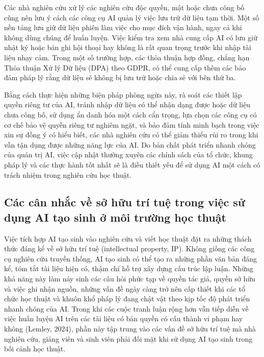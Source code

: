 Các nhà nghiên cứu xử lý các nghiên cứu độc quyền, mật hoặc chưa công bố cũng nên lưu ý cách các công cụ AI quản lý việc lưu trữ dữ liệu tạm thời. Một số nền tảng lưu giữ dữ liệu phiên làm việc cho mục đích vận hành, ngay cả khi không dùng chúng để huấn luyện. Việc kiểm tra xem nhà cung cấp AI có lưu giữ nhật ký hoặc bản ghi hội thoại hay không là rất quan trọng trước khi nhập tài liệu nhạy cảm. Trong một số trường hợp, các thỏa thuận hợp đồng, chẳng hạn Thỏa thuận Xử lý Dữ liệu (DPA) theo GDPR, có thể cung cấp thêm các bảo đảm pháp lý rằng dữ liệu sẽ không bị lưu trữ hoặc chia sẻ với bên thứ ba.

Bằng cách thực hiện những biện pháp phòng ngừa này, rà soát các thiết lập quyền riêng tư của AI, tránh nhập dữ liệu có thể nhận dạng được hoặc dữ liệu chưa công bố, sử dụng ẩn danh hóa một cách cẩn trọng, lựa chọn các công cụ có cơ chế bảo vệ quyền riêng tư nghiêm ngặt, và bảo đảm tính minh bạch trong việc xin sự đồng ý có hiểu biết, các nhà nghiên cứu có thể giảm thiểu rủi ro trong khi vẫn tận dụng được những năng lực của AI. Do bản chất phát triển nhanh chóng của quản trị AI, việc cập nhật thường xuyên các chính sách của tổ chức, khung pháp lý và các thực hành tốt nhất sẽ là điều thiết yếu để sử dụng AI một cách có trách nhiệm trong nghiên cứu học thuật.

\subsection{Các cân nhắc về sở hữu trí tuệ trong việc sử dụng AI tạo sinh ở môi trường học thuật}

Việc tích hợp AI tạo sinh vào nghiên cứu và viết học thuật đặt ra những thách thức đáng kể về sở hữu trí tuệ (intellectual property, IP). Không giống các công cụ nghiên cứu truyền thống, AI tạo sinh có thể tạo ra những phần văn bản đáng kể, tóm tắt tài liệu hiện có, thậm chí hỗ trợ xây dựng cấu trúc lập luận. Những khả năng này làm nảy sinh các câu hỏi phức tạp về quyền tác giả, quyền sở hữu và việc ghi nhận nguồn, những vấn đề ngày càng trở nên cấp thiết khi các tổ chức học thuật và khuôn khổ pháp lý đang chật vật theo kịp tốc độ phát triển nhanh chóng của AI. Trong khi các cuộc tranh luận rộng hơn vẫn tiếp diễn về việc huấn luyện AI trên các tài liệu có bản quyền có cấu thành vi phạm hay không (Lemley, 2024), phần này tập trung vào các vấn đề sở hữu trí tuệ mà nhà nghiên cứu, giảng viên và sinh viên phải đối mặt khi sử dụng AI tạo sinh trong bối cảnh học thuật.

